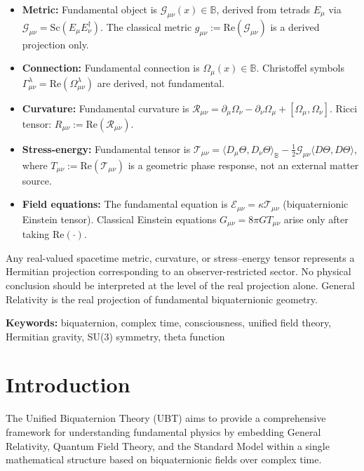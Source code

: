 \documentclass[12pt]{article}
\providecommand{\keywords}[1]{\textbf{Keywords:} #1}
\begin{document}
\begin{itemize}
\item \textbf{Metric:} Fundamental object is $\mathcal{G}_{\mu\nu}(x) \in \mathbb{B}$, derived from tetrads $E_\mu$ via $\mathcal{G}_{\mu\nu} = \text{Sc}(E_\mu E_\nu^\dagger)$. The classical metric $g_{\mu\nu} := \text{Re}(\mathcal{G}_{\mu\nu})$ is a derived projection only.

\item \textbf{Connection:} Fundamental connection is $\Omega_\mu(x) \in \mathbb{B}$. Christoffel symbols $\Gamma^\lambda_{\mu\nu} = \text{Re}(\Omega^\lambda_{\mu\nu})$ are derived, not fundamental.

\item \textbf{Curvature:} Fundamental curvature is $\mathcal{R}_{\mu\nu} = \partial_\mu \Omega_\nu - \partial_\nu \Omega_\mu + [\Omega_\mu, \Omega_\nu]$. Ricci tensor: $R_{\mu\nu} := \text{Re}(\mathcal{R}_{\mu\nu})$.

\item \textbf{Stress-energy:} Fundamental tensor is $\mathcal{T}_{\mu\nu} = \langle D_\mu\Theta, D_\nu\Theta \rangle_\mathbb{B} - \frac{1}{2}\mathcal{G}_{\mu\nu}\langle D\Theta, D\Theta \rangle$, where $T_{\mu\nu} := \text{Re}(\mathcal{T}_{\mu\nu})$ is a geometric phase response, not an external matter source.

\item \textbf{Field equations:} The fundamental equation is $\mathcal{E}_{\mu\nu} = \kappa \mathcal{T}_{\mu\nu}$ (biquaternionic Einstein tensor). Classical Einstein equations $G_{\mu\nu} = 8\pi G T_{\mu\nu}$ arise only after taking $\text{Re}(\cdot)$.
\end{itemize}

Any real-valued spacetime metric, curvature, or stress--energy tensor represents a Hermitian projection corresponding to an observer-restricted sector. No physical conclusion should be interpreted at the level of the real projection alone. General Relativity is the real projection of fundamental biquaternionic geometry.

\keywords{biquaternion, complex time, consciousness, unified field theory, Hermitian gravity, SU(3) symmetry, theta function}

\tableofcontents

\section{Introduction}

The Unified Biquaternion Theory (UBT) aims to provide a comprehensive framework for understanding fundamental physics by embedding General Relativity, Quantum Field Theory, and the Standard Model within a single mathematical structure based on biquaternionic fields over complex time.
\end{document}

